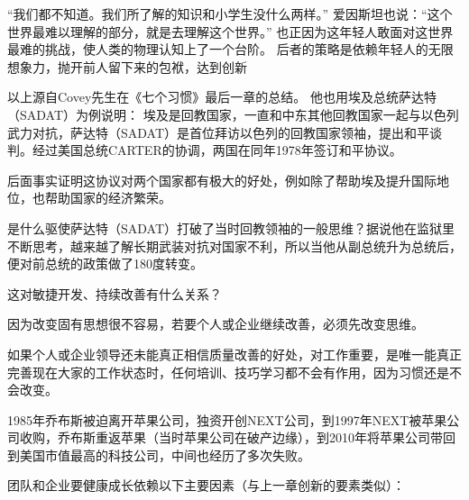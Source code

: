 “我们都不知道。我们所了解的知识和小学生没什么两样。” 爱因斯坦也说：“这个世界最难以理解的部分，就是去理解这个世界。” 也正因为这年轻人敢面对这世界最难的挑战，使人类的物理认知上了一个台阶。 后者的策略是依赖年轻人的无限想象力，抛开前人留下来的包袱，达到创新


以上源自Covey先生在《七个习惯》最后一章的总结。 他也用埃及总统萨达特（SADAT）为例说明： 埃及是回教国家，一直和中东其他回教国家一起与以色列武力对抗，萨达特（SADAT）是首位拜访以色列的回教国家领袖，提出和平谈判。经过美国总统CARTER的协调，两国在同年1978年签订和平协议。

后面事实证明这协议对两个国家都有极大的好处，例如除了帮助埃及提升国际地位，也帮助国家的经济繁荣。

是什么驱使萨达特（SADAT）打破了当时回教领袖的一般思维？据说他在监狱里不断思考，越来越了解长期武装对抗对国家不利，所以当他从副总统升为总统后，便对前总统的政策做了180度转变。

这对敏捷开发、持续改善有什么关系？

因为改变固有思想很不容易，若要个人或企业继续改善，必须先改变思维。

如果个人或企业领导还未能真正相信质量改善的好处，对工作重要，是唯一能真正完善现在大家的工作状态时，任何培训、技巧学习都不会有作用，因为习惯还是不会改变。

1985年乔布斯被迫离开苹果公司，独资开创NEXT公司，到1997年NEXT被苹果公司收购，乔布斯重返苹果（当时苹果公司在破产边缘），到2010年将苹果公司带回到美国市值最高的科技公司，中间也经历了多次失败。

团队和企业要健康成长依赖以下主要因素（与上一章创新的要素类似）：

